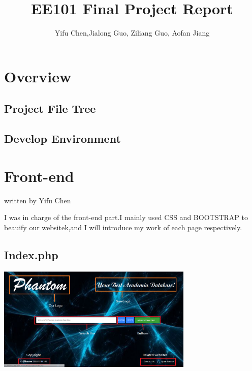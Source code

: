 \documentclass[10pt,twoside,a4paper,titlepage]{article}
\title{EE101 Final Project Report}
\author{Yifu Chen,Jialong Guo, Ziliang Guo, Aofan Jiang}
\begin{document}
\maketitle
\phantom{s}
\thispagestyle{empty}
\clearpage

\tableofcontents
\thispagestyle{empty}
\newpage
\setcounter{page}{1}

\section{Overview}
\subsection{Project File Tree}

\subsection{Develop Environment}


\section{Front-end}
written by Yifu Chen
	
	I was in charge of the front-end part.I mainly used CSS and BOOTSTRAP to beauify our websitek,and I will introduce my work  of each page respectively.
	
	\subsection{Index.php}
	
	\includegraphics[width=0.7\textwidth]{cyf/index_structure.PNG}
	
\end{document}
